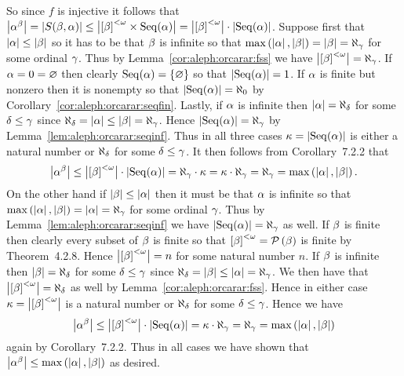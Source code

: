 {{  So since $f$ is injective it follows that $\abs{\a^\b} = \abs{\sba} \leq \abs{\bfs \times \Seq(\a)} = \abs{\bfs} \cdot \abs{\Seq(\a)}$.
  Suppose first that $\abs{\a} \leq \abs{\b}$ so it has to be that $\b$ is infinite so that $\maxab = \abs{\b} = \al_\g$ for some ordinal $\g$.
  Thus by Lemma~\ref{cor:aleph:orcarar:fss} we have $\abs{\bfs} = \al_\g$.
  If $\a = 0 = \es$ then clearly $\Seq(\a) = \braces{\es}$ so that $\abs{\Seq(\a)} = 1$.
  If $\a$ is finite but nonzero then it is nonempty so that $\abs{\Seq(\a)} = \al_0$ by Corollary~\ref{cor:aleph:orcarar:seqfin}.       Lastly, if $\a$ is infinite then $\abs{\a} = \al_\d$ for some $\d \leq \g$ since $\al_\d = \abs{\a} \leq \abs{\b} = \al_\g$.
  Hence $\abs{\Seq(\a)} = \al_\g$ by Lemma~\ref{lem:aleph:orcarar:seqinf}.
  Thus in all three cases $\k = \abs{\Seq(\a)}$ is either a natural number or $\al_\d$ for some $\d \leq \g$.
  It then follows from Corollary~7.2.2 that
  $$
    \abs{\a^\b} \leq \abs{\bfs} \cdot \abs{\Seq(\a)} = \al_\g \cdot \k = \k \cdot \al_\g = \al_\g = \maxab.
  $$
  On the other hand if $\abs{\b} \leq \abs{\a}$ then it must be that $\a$ is infinite so that $\maxab = \abs{\a} = \al_\g$ for some ordinal $\g$.
  Thus by Lemma~\ref{lem:aleph:orcarar:seqinf} we have $\abs{\Seq(\a)} = \al_\g$ as well.
  If $\b$ is finite then clearly every subset of $\b$ is finite so that $\bfs = \pset{\b}$ is finite by Theorem~4.2.8.
  Hence $\abs{\bfs} = n$ for some natural number $n$.
  If $\b$ is infinite then $\abs{\b} = \al_\d$ for some $\d \leq \g$ since $\al_\d = \abs{\b} \leq \abs{\a} = \al_\g$.
  We then have that $\abs{\bfs} = \al_\d$ as well by Lemma~\ref{cor:aleph:orcarar:fss}.
  Hence in either case $\k = \abs{\bfs}$ is a natural number or $\al_\d$ for some $\d \leq \g$.
  Hence we have
  $$
    \abs{\a^\b} \leq \abs{\bfs} \cdot \abs{\Seq(\a)} = \k \cdot \al_\g = \al_\g = \maxab
  $$
  again by Corollary~7.2.2.
  Thus in all cases we have shown that $\abs{\a^\b} \leq \maxab$ as desired.
}

\mainprob
{}}

